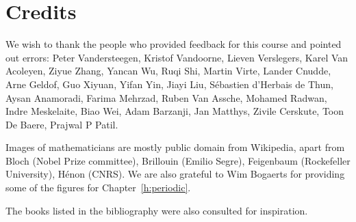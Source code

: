 \chapter{Credits}
\label{h:credits}

We wish to thank the people who provided feedback for this course and pointed out errors: Peter Vandersteegen, Kristof Vandoorne, Lieven Verslegers, Karel Van Acoleyen, Ziyue Zhang, Yancan Wu, Ruqi Shi, Martin Virte, Lander Cnudde, Arne Geldof, Guo Xiyuan, Yifan Yin, Jiayi Liu, S\'ebastien d’Herbais de Thun, Aysan Anamoradi, Farima Mehrzad, Ruben Van Assche, Mohamed Radwan, Indre Meskelaite, Biao Wei, Adam Barzanji, Jan Matthys, Zivile Cerskute, Toon De Baere, Prajwal P Patil.

Images of mathematicians are mostly public domain from Wikipedia, apart from Bloch (Nobel Prize committee), Brillouin (Emilio Segre), Feigenbaum (Rockefeller University), H\'{e}non (CNRS). We are also grateful to Wim Bogaerts for providing some of the figures for Chapter~\ref{h:periodic}.

The books listed in the bibliography were also consulted for inspiration.

